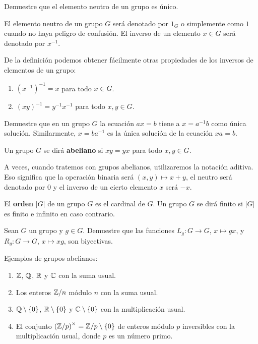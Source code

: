 \begin{exercise}
	Demuestre que el elemento neutro de un grupo es único. 
\end{exercise}

El elemento neutro de un grupo $G$ será denotado por $1_G$ o simplemente como
$1$ cuando no haya peligro de confusión. El inverso de un elemento $x\in G$ será denotado por $x^{-1}$. 

De la definición podemos obtener fácilmente otras propiedades de los inversos de elementos de un grupo:
\begin{enumerate}
	\item $(x^{-1})^{-1}=x$ para todo $x\in G$.
	\item $(xy)^{-1}=y^{-1}x^{-1}$ para todo $x,y\in G$. 
\end{enumerate}
	
\begin{exercise}
	Demuestre que en un grupo $G$ la ecuación $ax=b$ tiene a $x=a^{-1}b$ como
	única solución. Similarmente, $x=ba^{-1}$ es la única solución de la
	ecuación $xa=b$. 
\end{exercise}

\begin{definition}
	Un grupo $G$ se dirá \textbf{abeliano} si $xy=yx$ para todo $x,y\in G$.
\end{definition}

A veces, cuando tratemos con grupos abelianos, utilizaremos la notación
aditiva. Eso significa que la operación binaria será $(x,y)\mapsto x+y$, el neutro será denotado por $0$ 
y el inverso de un cierto elemento $x$ será $-x$. 

\begin{definition}
El \textbf{orden} $|G|$ de un grupo $G$ es el cardinal de $G$. Un grupo $G$ se dirá finito
si $|G|$ es finito e infinito en caso contrario. 
\end{definition}

\begin{exercise}
	Sean $G$ un grupo y $g\in G$. Demuestre que las funciones $L_g\colon G\to
	G$, $x\mapsto gx$, y $R_g\colon G\to G$, $x\mapsto xg$, son biyectivas.
\end{exercise}

\begin{examples}
	Ejemplos de grupos abelianos:
	\begin{enumerate}
		\item $\mathbb{Z}$, $\mathbb{Q}$, $\mathbb{R}$ y $\mathbb{C}$ con la suma usual.
		\item Los enteros $\mathbb{Z}/n$ módulo $n$ con la suma usual.
		\item $\mathbb{Q}\setminus\{0\}$, $\mathbb{R}\setminus\{0\}$ y $\mathbb{C}\setminus\{0\}$ con
			la multiplicación usual. 
		\item El conjunto $\left(\mathbb{Z}/p\right)^\times=\mathbb{Z}/p\setminus\{0\}$ de enteros módulo $p$ inversibles con la multiplicación usual, donde
			$p$ es un número primo. 
	\end{enumerate}
\end{examples}


